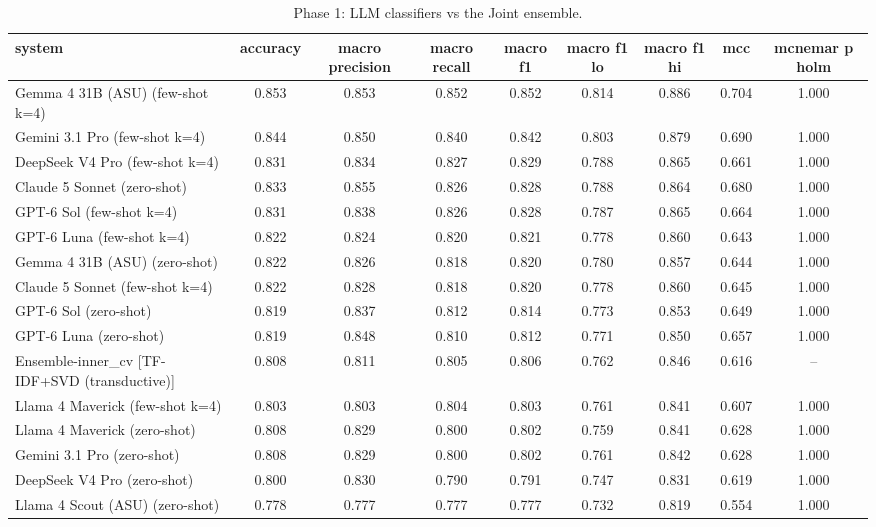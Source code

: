 \begin{table}[htbp]
\centering
\caption{Phase 1: LLM classifiers vs the Joint ensemble.}
\label{tab:table3_llm_vs_ensemble}
\small
\begin{tabular}{lcccccccc}
\toprule
\textbf{system} & \textbf{accuracy} & \textbf{macro precision} & \textbf{macro recall} & \textbf{macro f1} & \textbf{macro f1 lo} & \textbf{macro f1 hi} & \textbf{mcc} & \textbf{mcnemar p holm} \\
\midrule
Gemma 4 31B (ASU) (few-shot k=4) & 0.853 & 0.853 & 0.852 & 0.852 & 0.814 & 0.886 & 0.704 & 1.000 \\
Gemini 3.1 Pro (few-shot k=4) & 0.844 & 0.850 & 0.840 & 0.842 & 0.803 & 0.879 & 0.690 & 1.000 \\
DeepSeek V4 Pro (few-shot k=4) & 0.831 & 0.834 & 0.827 & 0.829 & 0.788 & 0.865 & 0.661 & 1.000 \\
Claude 5 Sonnet (zero-shot) & 0.833 & 0.855 & 0.826 & 0.828 & 0.788 & 0.864 & 0.680 & 1.000 \\
GPT-6 Sol (few-shot k=4) & 0.831 & 0.838 & 0.826 & 0.828 & 0.787 & 0.865 & 0.664 & 1.000 \\
GPT-6 Luna (few-shot k=4) & 0.822 & 0.824 & 0.820 & 0.821 & 0.778 & 0.860 & 0.643 & 1.000 \\
Gemma 4 31B (ASU) (zero-shot) & 0.822 & 0.826 & 0.818 & 0.820 & 0.780 & 0.857 & 0.644 & 1.000 \\
Claude 5 Sonnet (few-shot k=4) & 0.822 & 0.828 & 0.818 & 0.820 & 0.778 & 0.860 & 0.645 & 1.000 \\
GPT-6 Sol (zero-shot) & 0.819 & 0.837 & 0.812 & 0.814 & 0.773 & 0.853 & 0.649 & 1.000 \\
GPT-6 Luna (zero-shot) & 0.819 & 0.848 & 0.810 & 0.812 & 0.771 & 0.850 & 0.657 & 1.000 \\
Ensemble-inner\_cv [TF-IDF+SVD (transductive)] & 0.808 & 0.811 & 0.805 & 0.806 & 0.762 & 0.846 & 0.616 & -- \\
Llama 4 Maverick (few-shot k=4) & 0.803 & 0.803 & 0.804 & 0.803 & 0.761 & 0.841 & 0.607 & 1.000 \\
Llama 4 Maverick (zero-shot) & 0.808 & 0.829 & 0.800 & 0.802 & 0.759 & 0.841 & 0.628 & 1.000 \\
Gemini 3.1 Pro (zero-shot) & 0.808 & 0.829 & 0.800 & 0.802 & 0.761 & 0.842 & 0.628 & 1.000 \\
DeepSeek V4 Pro (zero-shot) & 0.800 & 0.830 & 0.790 & 0.791 & 0.747 & 0.831 & 0.619 & 1.000 \\
Llama 4 Scout (ASU) (zero-shot) & 0.778 & 0.777 & 0.777 & 0.777 & 0.732 & 0.819 & 0.554 & 1.000 \\

\end{tabular}
\end{table}

